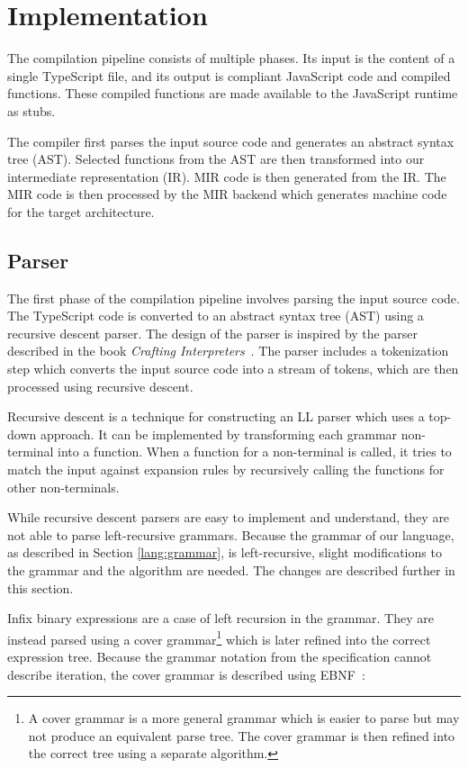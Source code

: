 \chapter{Implementation}

The compilation pipeline consists of multiple phases. Its input is the content of a single TypeScript file, and its output is compliant JavaScript code and compiled functions. These compiled functions are made available to the JavaScript runtime as stubs.

The compiler first parses the input source code and generates an abstract syntax tree (AST). Selected functions from the AST are then transformed into our intermediate representation (IR). MIR code is then generated from the IR. The MIR code is then processed by the MIR backend which generates machine code for the target architecture.


\section{Parser}

The first phase of the compilation pipeline involves parsing the input source code. The TypeScript code is converted to an abstract syntax tree (AST) using a recursive descent parser. The design of the parser is inspired by the parser described in the book \textit{Crafting Interpreters}~\cite{craftinginterpreters}. The parser includes a tokenization step which converts the input source code into a stream of tokens, which are then processed using recursive descent.

Recursive descent is a technique for constructing an LL parser which uses a top-down approach. It can be implemented by transforming each grammar non-terminal into a function. When a function for a non-terminal is called, it tries to match the input against expansion rules by recursively calling the functions for other non-terminals.

While recursive descent parsers are easy to implement and understand, they are not able to parse left-recursive grammars. Because the grammar of our language, as described in Section \ref{lang:grammar}, is left-recursive, slight modifications to the grammar and the algorithm are needed. The changes are described further in this section.

Infix binary expressions are a case of left recursion in the grammar. They are instead parsed using a cover grammar\footnote{A cover grammar is a more general grammar which is easier to parse but may not produce an equivalent parse tree. The cover grammar is then refined into the correct tree using a separate algorithm.} which is later refined into the correct expression tree. Because the grammar notation from the specification cannot describe iteration, the cover grammar is described using EBNF~\cite{iso14977}:

